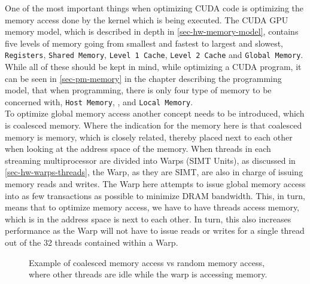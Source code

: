 One of the most important things when optimizing CUDA code is optimizing the memory access done by the kernel which is being executed. The CUDA GPU memory model, which is described in depth in \cref{sec-hw-memory-model}, contains five levels of memory going from smallest and fastest to largest and slowest, \texttt{Registers}, \texttt{Shared Memory}, \texttt{Level 1 Cache}, \texttt{Level 2 Cache} and \texttt{Global Memory}. While all of these should be kept in mind, while optimizing a CUDA program, it can be seen in \cref{sec-pm-memory} in the chapter describing the programming model, that when programming, there is only four type of memory to be concerned with, \texttt{Host Memory}, ,  and \texttt{Local Memory}.\\
To optimize global memory access another concept needs to be introduced, which is coalesced memory. Where the indication for the memory here is that coalesced memory is memory, which is closely related, thereby placed next to each other when looking at the address space of the memory. When threads in each streaming multiprocessor are divided into Warps (SIMT Units), as discussed in \cref{sec-hw-warps-threads}, the Warp, as they are SIMT, are also in charge of issuing memory reads and writes. The Warp here attempts to issue global memory access into as few transactions as possible to minimize DRAM bandwidth. This, in turn, means that to optimize memory access, we have to have threads access memory, which is in the address space is next to each other. In turn, this also increases performance as the Warp will not have to issue reads or writes for a single thread out of the 32 threads contained within a Warp.\\

\begin{figure}[ht]
	\centering
	\caption{Example of coalesced memory access vs random memory access, where other threads are idle while the warp is accessing memory.}
	\label{fig:coalesced_memory}
\end{figure}

